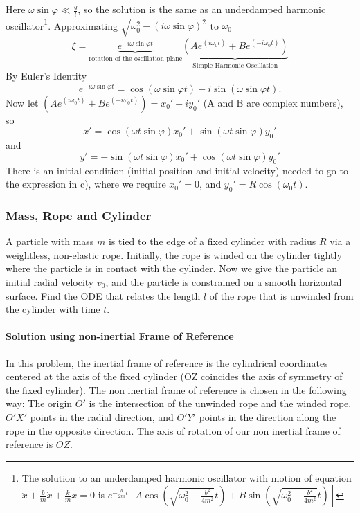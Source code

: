 \documentclass[a4paper,12pt,titlepage]{article}
\begin{document}
Here $\omega\sin\varphi\ll\frac{g}{l}$, so the solution is the same as an underdamped harmonic oscillator\footnote{The solution to an underdamped harmonic oscillator with motion of equation $\ddot x+\frac{b}{m}\dot x+\frac{k}{m}x=0$ is $e^{-\frac{b}{2m}t}\left[A\cos\left(\sqrt{\omega_0^2-\frac{b^2}{4m^2}}t\right)+B\sin\left(\sqrt{\omega_0^2-\frac{b^2}{4m^2}}t\right)\right]$}. Approximating $\sqrt{\omega_0^2-(i\omega\sin\varphi)^2}$ to $\omega_0$
\[\xi=\underbrace{e^{-i\omega\sin\varphi t}}_{\text{rotation of the oscillation plane}}\underbrace{(Ae^{(i\omega_0 t)}+Be^{(-i\omega_0 t)})}_{\text{Simple Harmonic Oscillation}}\]
By Euler's Identity \[e^{-i\omega\sin\varphi t}=\cos(\omega\sin\varphi t)-i\sin(\omega\sin\varphi t).\] Now let $(Ae^{(i\omega_0 t)}+Be^{(-i\omega_0 t)})=x_0'+iy_0'$ (A and B are complex numbers), so \[x'=\cos(\omega t\sin\varphi)x_0'+\sin(\omega t\sin\varphi)y_0'\] and \[y'=-\sin(\omega t\sin\varphi)x_0'+\cos(\omega t\sin\varphi)y_0'\]
There is an initial condition (initial position and initial velocity) needed to go to the expression in c), where we require $x_0'=0$, and $y_0'=R\cos(\omega_0 t)$.
\subsubsection{Mass, Rope and Cylinder}
A particle with mass $m$ is tied to the edge of a fixed cylinder with radius $R$ via a weightless, non-elastic rope. Initially, the rope is winded on the cylinder tightly where the particle is in contact with the cylinder.  Now we give the particle an initial radial velocity $v_0$, and the particle is constrained on a smooth horizontal surface. Find the ODE that relates the length $l$ of the rope that is unwinded from the cylinder with time $t$.
\paragraph{Solution using non-inertial Frame of Reference}

In this problem, the inertial frame of reference is the cylindrical coordinates centered at the axis of the fixed cylinder (OZ coincides the axis of symmetry of the fixed cylinder). The non inertial frame of reference is chosen in the following way: The origin $O'$ is the intersection of the unwinded rope and the winded rope. $O'X'$ points in the radial direction, and $O'Y'$ points in the direction along the rope in the opposite direction. The axis of rotation of our non inertial frame of reference is $OZ$.
\end{document}
